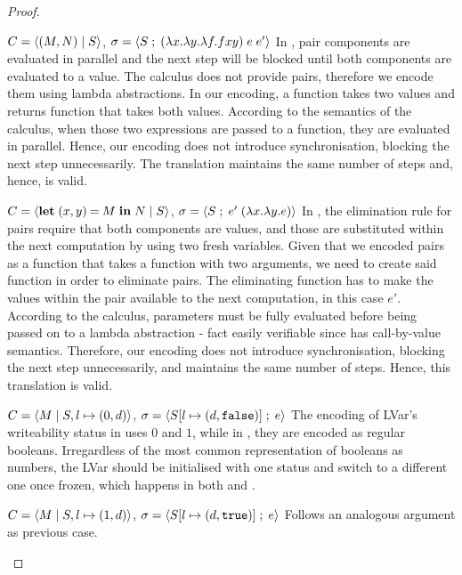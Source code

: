 \documentclass[main.tex]{subfiles}
\begin{document}
\begin{proof}
  \begin{case}{%
      $ C = \langle {\ensuremath{(M,N)}}\;\vert\;{S} \rangle$,
      $\sigma = \langle {S} \; ; \;{(\lambda x. \lambda y.\lambda f. f x y)\;e\;e'} \rangle$}
    In \typedlambdalvar, pair components are evaluated in parallel and the next step will be blocked until both components are evaluated to a value. The \lambdalvar calculus does not provide pairs, therefore we encode them using lambda abstractions. In our encoding, a function takes two values and returns function that takes both values. According to the semantics of the \lambdalvar  calculus, when those two expressions are passed to a function, they are evaluated in parallel. Hence, our encoding does not introduce synchronisation, blocking the next step unnecessarily. The translation maintains the same number of steps and, hence, is valid.
  \end{case}

  \begin{case}{%
      $C = \langle {\ensuremath{\mathbf{let}\;(x,y)\mathbin{=}M\;\mathbf{in}\;N}}\;\vert\;{S} \rangle$,
      $\sigma = \langle {S} \; ; \;{e' \;(\lambda x.\lambda y. e)} \rangle$}
    In \typedlambdalvar, the elimination rule for pairs require that both components are values, and those are substituted within the next computation by using two fresh variables. Given that we encoded pairs as a function that takes a function with two arguments, we need to create said function in order to eliminate pairs. The eliminating function has to make the values within the pair available to the next computation, in this case $e'$. According to the \lambdalvar calculus, parameters must be fully evaluated before being passed on to a lambda abstraction - fact easily verifiable since \lambdalvar has call-by-value semantics. Therefore, our encoding does not introduce synchronisation, blocking the next step unnecessarily, and maintains the same number of steps. Hence, this translation is valid.
  \end{case}

  \begin{case}{%
      $C = \langle {M}\;\vert\;{S, l \mapsto (0, d)} \rangle$,
      $\sigma = \langle {S[l \mapsto (d, \tt{false})]} \; ; \;{e} \rangle$}
    The encoding of LVar's writeability status in \typedlambdalvar uses $0$ and $1$,
    while in \lambdalvar, they are encoded as regular booleans. Irregardless of the most
    common representation of booleans as numbers, the LVar should be initialised
    with one status and switch to a different one once frozen, which happens in
    both \lambdalvar and \typedlambdalvar.
  \end{case}

  \begin{case}{%
      $C = \langle {M}\;\vert\;{S, l \mapsto (1, d)} \rangle$,
      $ \sigma = \langle {S[l \mapsto (d, \tt{true})]} \; ; \;{e} \rangle$}
    Follows an analogous argument as previous case.
  \end{case}

\end{proof}
\end{document}

